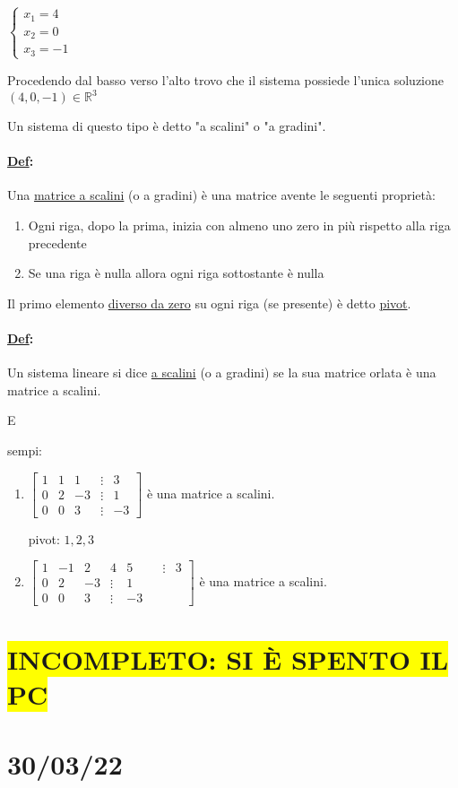 \documentclass{article}
\newcommand{\hl}[1]{\colorbox{yellow}{#1}}
\newcommand{\ul}[1]{\underline{#1}}
\newcommand{\R}{\mathbb{R}}
\newcommand{\Def}[2]{\paragraph{\ul{Def}:}#1\\\hspace*{3em}\begin{minipage}{.8\textwidth}#2\end{minipage}}
\begin{document}
$\begin{cases}
		x_1=4 \\
		x_2=0 \\
		x_3=-1
	\end{cases}$

Procedendo dal basso verso l'alto trovo che il sistema possiede l'unica soluzione $(4,0,-1)\in\R^3$

Un sistema di questo tipo è detto "a scalini" o "a gradini".

\Def{Una \ul{matrice a scalini} (o a gradini) è una matrice avente le seguenti proprietà:}{
	\begin{enumerate}
		\item Ogni riga, dopo la prima, inizia con almeno uno zero in più rispetto alla riga precedente
		\item Se una riga è nulla allora ogni riga sottostante è nulla
	\end{enumerate}
}
Il primo elemento \ul{diverso da zero} su ogni riga (se presente) è detto \ul{pivot}.

\Def{ Un sistema lineare si dice \ul{a scalini} (o a gradini) se la sua matrice orlata è una matrice a scalini.}

Esempi:
\begin{enumerate}
	\item $\begin{bmatrix}
			      1 & 1 & 1  & \vdots & 3  \\
			      0 & 2 & -3 & \vdots & 1  \\
			      0 & 0 & 3  & \vdots & -3
		      \end{bmatrix}$ è una matrice a scalini.

	      pivot: $1,2,3$
	\item $\begin{bmatrix}
			      1 & -1 & 2  & 4      & 5  &  & \vdots & 3 \\
			      0 & 2  & -3 & \vdots & 1                  \\
			      0 & 0  & 3  & \vdots & -3
		      \end{bmatrix}$ è una matrice a scalini.
\end{enumerate}
\section*{\hl{INCOMPLETO: SI È SPENTO IL PC}}
\section{30/03/22}
\end{document}
